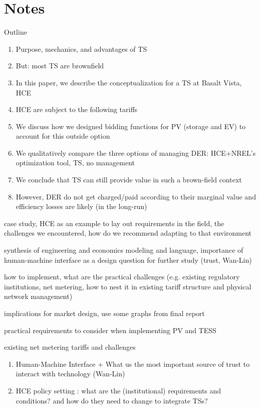 \section{Notes}

Outline

\begin{enumerate}
    \item Purpose, mechanics, and advantages of TS
    \item But: most TS are brownfield
    \item In this paper, we describe the conceptualization for a TS at Basalt Vista, HCE
    \item HCE are subject to the following tariffs
    \item We discuss how we designed bidding functions for PV (storage and EV) to account for this outside option
    \item We qualitatively compare the three options of managing DER: HCE+NREL's optimization tool, TS, no management
    \item We conclude that TS can still provide value in such a brown-field context
    \item However, DER do not get charged/paid according to their marginal value and efficiency losses are likely (in the long-run)
\end{enumerate}

case study, HCE as an example to lay out requirements in the field, the challenges we encountered, how do we recommend adapting to that environment

synthesis of engineering and economics modeling and language, importance of human-machine interface as a design question for further study (trust, Wan-Lin)

how to implement, what are the practical challenges (e.g. existing regulatory institutions, net metering, how to nest it in existing tariff structure and physical network management)

implications for market design, use some graphs from final report

practical requirements to consider when implementing PV and TESS

existing net metering tariffs and challenges


\begin{enumerate}
    \item Human-Machine Interface + What us the most important source of trust to interact with technology (Wan-Lin)
    \item HCE policy setting : what are the (institutional) requirements and conditions? and how do they need to change to integrate TSs?
\end{enumerate}

